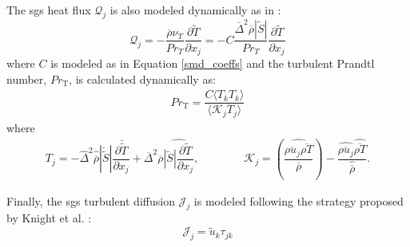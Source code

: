 The \gls{sgs} heat flux $\mathcal{Q}_j$ is also modeled dynamically as in \cite{LES_Comp}:
\begin{equation} \label{sgs_heat_flux}
\mathcal{Q}_j = - \dfrac{\overline{\rho}\nu_T}{Pr_T} \dfrac{\partial \widetilde{T}}{\partial x_j} = - C\dfrac{\overline{\Delta}^2 \overline{\rho}  |\widetilde{S}|}{Pr_T} \dfrac{\partial \widetilde{T}}{\partial x_j} 
\end{equation}
where $C$ is modeled as in Equation \eqref{smd_coeffs} and the turbulent Prandtl number, $Pr_\text{T}$, is calculated dynamically as:
\begin{equation}
\begin{aligned}
	Pr_\text{T} = \dfrac{C \langle T_k T_k  \rangle}{\langle \mathcal{K}_j T_j \rangle}
\end{aligned}
\end{equation}
where 
\begin{equation} \label{smd_other}
\begin{aligned}
	T_j = - \widehat{\Delta}^2  \widehat{\overline{\rho}} |\breve{\widetilde{S}}| \dfrac{\partial \breve{\widetilde{T}}}{\partial x_j} +  \overline{\Delta}^2  \overline{\rho} \widehat{|\widetilde{S}| \dfrac{\partial \widetilde{T}}{\partial x_j}}, \qquad \qquad \mathcal{K}_j = \left( \dfrac{ \widehat{\overline{\rho u_j} \overline{\rho T}}}{\overline{\rho}} \right) - \dfrac{ \widehat{\overline{\rho u_j}} \widehat{ \overline{\rho T}}}{\widehat{\overline{\rho}}}.
\end{aligned}
\end{equation}

Finally, the \gls{sgs} turbulent diffusion $\mathcal{J}_j$ is modeled following the strategy proposed by Knight et al. \cite{knight}:
\begin{equation} \label{sgs_turb_diff}
\mathcal{J}_j = \widetilde{u}_k \tau_{jk}
\end{equation}

